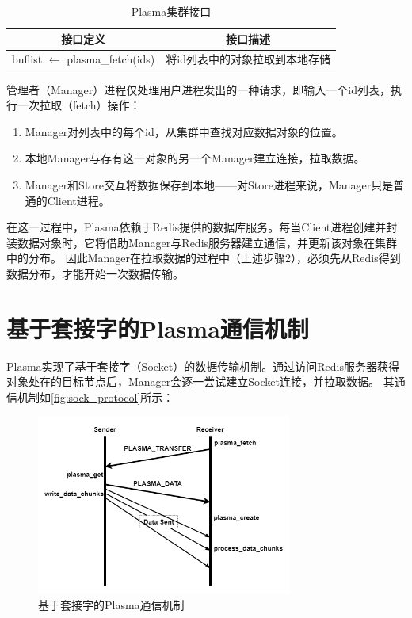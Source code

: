 \begin{table}[h]
    \centering
    \caption{Plasma集群接口}
    \begin{tabular}{*{2}{c}}
        \toprule
        接口定义 & 接口描述      \\
        \midrule
        buflist $\leftarrow$ plasma\_fetch(ids)               & 将id列表中的对象拉取到本地存储   \\
        \bottomrule
    \end{tabular}
    \label{tab:manager_api}
\end{table}

管理者（Manager）进程仅处理用户进程发出的一种请求，即输入一个id列表，执行一次拉取（fetch）操作：

\begin{enumerate}
    \item Manager对列表中的每个id，从集群中查找对应数据对象的位置。 
    \item 本地Manager与存有这一对象的另一个Manager建立连接，拉取数据。
    \item Manager和Store交互将数据保存到本地——对Store进程来说，Manager只是普通的Client进程。
\end{enumerate}

在这一过程中，Plasma依赖于Redis提供的数据库服务。每当Client进程创建并封装数据对象时，它将借助Manager与Redis服务器建立通信，并更新该对象在集群中的分布。
因此Manager在拉取数据的过程中（上述步骤2），必须先从Redis得到数据分布，才能开始一次数据传输。

\section{基于套接字的Plasma通信机制}

Plasma实现了基于套接字（Socket）的数据传输机制。通过访问Redis服务器获得对象处在的目标节点后，Manager会逐一尝试建立Socket连接，并拉取数据。
其通信机制如\autoref{fig:sock_protocol}所示：

\begin{figure}[h] 
    \centering
    \includegraphics[width=0.75\textwidth]{image/chap02/sock_protocol.png}
    \caption{基于套接字的Plasma通信机制}
    \label{fig:sock_protocol}
\end{figure}

